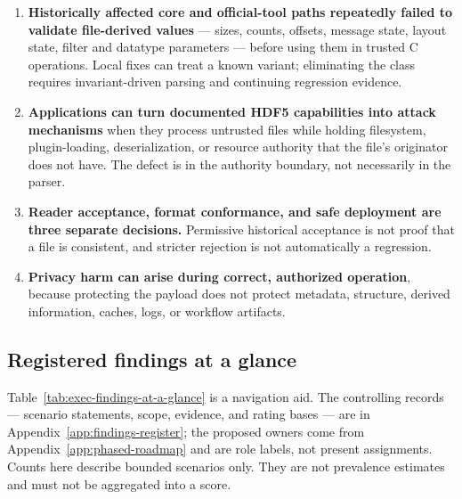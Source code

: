\documentclass[../main.tex]{subfiles}
\begin{document}
\begin{enumerate}
    \item \textbf{Historically affected core and official-tool paths repeatedly
          failed to validate file-derived values} --- sizes, counts, offsets,
          message state, layout state, filter and datatype parameters ---
          before using them in trusted C operations. Local fixes can treat a
          known variant; eliminating the class requires invariant-driven
          parsing and continuing regression evidence.
    \item \textbf{Applications can turn documented HDF5 capabilities into
          attack mechanisms} when they process untrusted files while holding
          filesystem, plugin-loading, deserialization, or resource authority
          that the file's originator does not have. The defect is in the
          authority boundary, not necessarily in the parser.
    \item \textbf{Reader acceptance, format conformance, and safe deployment
          are three separate decisions.} Permissive historical acceptance is
          not proof that a file is consistent, and stricter rejection is not
          automatically a regression.
    \item \textbf{Privacy harm can arise during correct, authorized
          operation}, because protecting the payload does not protect
          metadata, structure, derived information, caches, logs, or workflow
          artifacts.
\end{enumerate}

\subsection*{Registered findings at a glance}

Table~\ref{tab:exec-findings-at-a-glance} is a navigation aid. The controlling
records --- scenario statements, scope, evidence, and rating bases --- are in
Appendix~\ref{app:findings-register}; the proposed owners come from
Appendix~\ref{app:phased-roadmap} and are role labels, not present
assignments. Counts here describe bounded scenarios only. They are not
prevalence estimates and must not be aggregated into a score.
\end{document}
